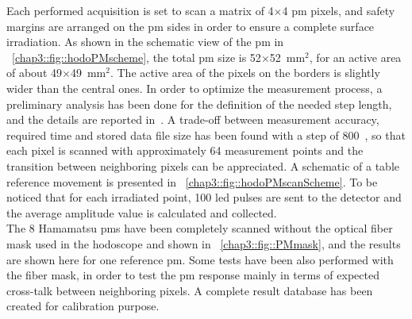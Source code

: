 Each performed acquisition is set to scan a matrix of 4$\times$4 \gls{pm} pixels, and safety margins are arranged on the \gls{pm} sides in order to ensure a complete surface irradiation. As shown in the schematic view of the \gls{pm} in \figurename~\ref{chap3::fig::hodoPMscheme}, the total \gls{pm} size is 52$\times$52~mm$^{2}$, for an active area of about 49$\times$49~mm$^{2}$. The active area of the pixels on the borders is slightly wider than the central ones. In order to optimize the measurement process, a preliminary analysis has been done for the definition of the needed step length, and the details are reported in~\cite{Coudurier2015}. A trade-off between measurement accuracy, required time and stored data file size has been found with a step of 800~\charmum, so that each pixel is scanned with approximately 64 measurement points and the transition between neighboring pixels can be appreciated. A schematic of a table reference movement is presented in \figurename~\ref{chap3::fig::hodoPMscanScheme}. To be noticed that for each irradiated point, 100 \gls{led} pulses are sent to the detector and the average amplitude value is calculated and collected.\\  
The 8 Hamamatsu \glspl{pm} have been completely scanned without the optical fiber mask used in the hodoscope and shown in \figurename~\ref{chap3::fig::PMmask}, and the results are shown here for one reference \gls{pm}. Some tests have been also performed with the fiber mask, in order to test the \gls{pm} response mainly in terms of expected cross-talk between neighboring pixels. A complete result database has been created for calibration purpose.\\

